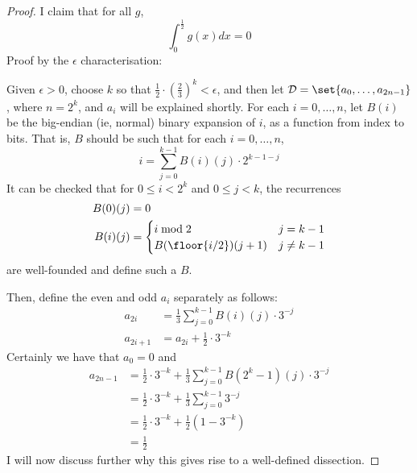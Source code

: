 \documentclass[fleqn,a4paper,11pt]{article}
\begin{document}
\begin{proof}
  I claim that for all \(g\),
  \begin{equation*}
   \int_0^{\tfrac 12} g(x) dx = 0
  \end{equation*}
  Proof by the \(\epsilon\) characterisation:

  Given \(\epsilon > 0\), choose \(k\) so that
  \(\tfrac 12 \cdot(\tfrac 23)^k < \epsilon\), and then let
  \newcommand*\dissD{\mathcal D}%
  \(\dissD = \set{a_0, \dotsc, a_{2n - 1}}\), where \(n = 2^k\), and \(a_i\)
  will be explained shortly. For each \(i = 0, \dotsc, n\), let \(B(i)\) be the
  big-endian (ie, normal) binary expansion of \(i\), as a function from index to
  bits. That is, \(B\) should be such that for each \(i = 0, \dotsc, n\),
  \begin{equation*} \label{eq_binary}
   i = \sum_{j = 0}^{k - 1} B(i)(j) \cdot 2^{k - 1 - j}
   \tag{\(\dag\)}
  \end{equation*}
  It can be checked that for \(0 \le i < 2^k\) and \(0 \le j < k\), the
  recurrences
  \begin{align*}
   B(0)(j) &= 0 \\
   B(i)(j) &=
   \begin{cases}
    i \bmod 2 & j = k - 1 \\
    B(\floor{i/2})(j + 1) & j \ne k - 1
   \end{cases}
  \end{align*}
  are well-founded and define such a \(B\).

  Then, define the even and odd \(a_i\) separately as follows:
  \begin{align*}
   a_{2i} &= \tfrac 13 \sum_{j = 0}^{k - 1} B(i)(j) \cdot 3^{-j} \\
   a_{2i + 1} &= a_{2i} + \tfrac 12 \cdot 3^{-k}
  \end{align*}
  Certainly we have that \(a_0 = 0\) and
  \begin{align*}
   a_{2n - 1}
    &= \tfrac 12 \cdot 3^{-k}
     + \tfrac 13 \sum_{j = 0}^{k - 1} B(2^k - 1)(j) \cdot 3^{-j} \\
    &= \tfrac 12 \cdot 3^{-k} + \tfrac 13 \sum_{j = 0}^{k - 1} 3^{-j} \\
    &= \tfrac 12 \cdot 3^{-k} + \tfrac 12 (1 - 3^{-k}) \\
    &= \tfrac 12
  \end{align*}
  I will now discuss further why this gives rise to a well-defined dissection.


\end{proof}
\end{document}
